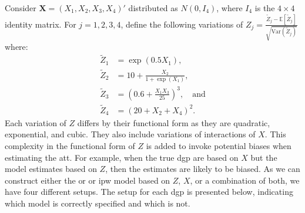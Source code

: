 Consider $\mathbf{X} = (X_1, X_2, X_3, X_4)'$ distributed as $N(0, I_4)$, where $I_4$ is the $4 \times 4$ identity matrix.
For $j = 1, 2, 3, 4$, \citet{kang2007demystifying} define the following variations of $Z_j = \frac{\tilde{Z}_j - \mathbb{E}[\tilde{Z}_j]}{\sqrt{\text{Var}(\tilde{Z}_j)}}$ where:
\begin{align} \nonumber
\tilde{Z}_1 &= \exp(0.5X_1), \\ \nonumber
\tilde{Z}_2 &= 10 + \frac{X_2}{1 + \exp(X_1)}, \\
\tilde{Z}_3 &= (0.6 + \frac{X_1 X_3}{25})^3, \quad \text{and} \\ \nonumber
\tilde{Z}_4 &= (20 + X_2 + X_4)^2.  \nonumber
\label{eq:13}
\end{align}
Each variation of $Z$ differs by their functional form as they are quadratic, exponential, and cubic.
They also include variations of interactions of $X$.
This complexity in the functional form of $Z$ is added to invoke potential biases when estimating the \ac{att}.
For example, when the true \ac{dgp} are based on $X$ but the model estimates based on $Z$, then the estimates are likely to be biased.
As we can construct either the \ac{or} or \ac{ipw} model based on $Z$, $X$, or a combination of both, we have four different setups.
The setup for each \ac{dgp} is presented below, indicating which model is correctly specified and which is not.
